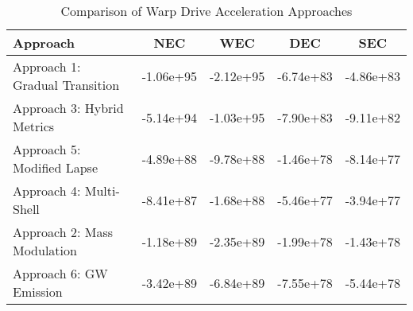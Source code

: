 \begin{table}[htbp]
\centering
\caption{Comparison of Warp Drive Acceleration Approaches}
\label{tab:acceleration_comparison}
\begin{tabular}{lcccc}
\hline
Approach & NEC & WEC & DEC & SEC \\
\hline
Approach 1: Gradual Transition & -1.06e+95 & -2.12e+95 & -6.74e+83 & -4.86e+83 \\
Approach 3: Hybrid Metrics & -5.14e+94 & -1.03e+95 & -7.90e+83 & -9.11e+82 \\
Approach 5: Modified Lapse & -4.89e+88 & -9.78e+88 & -1.46e+78 & -8.14e+77 \\
Approach 4: Multi-Shell & -8.41e+87 & -1.68e+88 & -5.46e+77 & -3.94e+77 \\
Approach 2: Mass Modulation & -1.18e+89 & -2.35e+89 & -1.99e+78 & -1.43e+78 \\
Approach 6: GW Emission & -3.42e+89 & -6.84e+89 & -7.55e+78 & -5.44e+78 \\
\hline
\end{tabular}
\end{table}